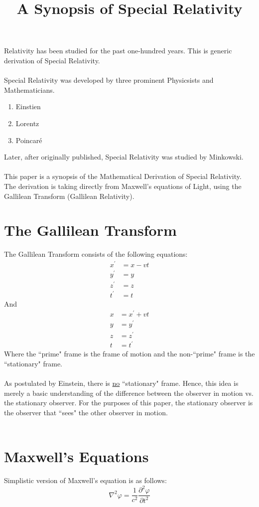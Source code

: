 \documentclass[letterpaper]{article}
\title{A Synopsis of Special Relativity}
\begin{document}
\maketitle
\noindent
Relativity has been studied for the past one-hundred years.  This is
generic derivation of Special Relativity.\\\\
Special Relativity was developed by three prominent Physicsists and
Mathematicians.
\begin{enumerate}
\item Einstien
\item Lorentz
\item Poincar\'e
\end{enumerate}
Later, after originally published, Special Relativity was studied by
Minkowski.\\\\
This paper is a synopsis of the Mathematical Derivation of Special
Relativity.  The derivation is taking directly from Maxwell's
equations of Light, using the Gallilean Transform (Gallilean
Relativity).
\section{The Gallilean Transform}
The Gallilean Transform consists of the following equations:
\begin{align*}
x^\prime &= x-vt\\
y^\prime &= y\\
z^\prime &= z\\
t^\prime &= t
\end{align*}
And
\begin{align*}
x &= x^\prime+vt\\
y &= y^\prime\\
z &= z^\prime\\
t &= t^\prime
\end{align*}
Where the ``prime" frame is the frame of motion and the non-``prime"
frame is the ``stationary" frame.\\\\
As postulated by Einstein, there is \underline{no} ``stationary"
frame.  Hence, this idea is merely a basic understanding of the
difference between the observer in motion vs. the stationary observer.
For the purposes of this paper, the stationary
observer is the observer that ``sees" the other observer in motion.
\\\\
\section{Maxwell's Equations}
Simplistic version of Maxwell's equation is as follows:
\begin{equation*}
\nabla^2\varphi = \frac{1}{c^2}\frac{\partial^2\varphi}{\partial t^2}
\end{equation*}
\end{document}
